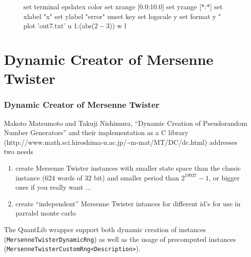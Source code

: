 \documentclass{beamer}
\begin{document}
\begin{frame}[fragile]
\begin{figure}
	 \begin{gnuplot}
       set terminal epslatex color
       set xrange [0.0:10.0]
       set yrange [*:*]
       set xlabel "x"
       set ylabel "error"
       unset key
       set logscale y
       set format y "%
       plot 'out7.txt' u 1:(abs($2-$3)) w l
	 \end{gnuplot}
\end{figure}
\end{frame}





\section{Dynamic Creator of Mersenne Twister}

\begin{frame}[fragile]
\frametitle{Dynamic Creator of Mersenne Twister}

Makoto Matsumoto and Takuji Nishimura, ``Dynamic Creation of Pseudorandom Number Generators'' and their implementation as a C library (http://www.math.sci.hiroshima-u.ac.jp/\~{}m-mat/MT/DC/dc.html) addresses two needs

\begin{enumerate}
\item create Mersenne Twister instances with smaller state space than the classic instance (624 words of 32 bit) and smaller period than $2^{19937}-1$, or bigger ones if you really want ...
\item create ``independent'' Mersenne Twister intances for different id's for use in parralel monte carlo
\end{enumerate}

The QuantLib wrapper support both dynamic creation of instances (\verb+MersenneTwisterDynamicRng+) as well as the usage of precomputed instances (\verb+MersenneTwisterCustomRng<Description>+).
\end{frame}
\end{document}
